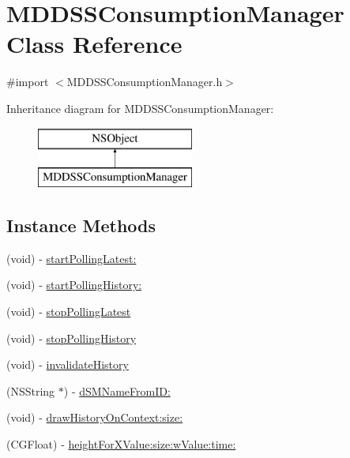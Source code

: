 \hypertarget{interface_m_d_d_s_s_consumption_manager}{\section{M\-D\-D\-S\-S\-Consumption\-Manager Class Reference}
\label{interface_m_d_d_s_s_consumption_manager}
}


{\ttfamily \#import $<$M\-D\-D\-S\-S\-Consumption\-Manager.\-h$>$}

Inheritance diagram for M\-D\-D\-S\-S\-Consumption\-Manager\-:\begin{figure}[H]
\begin{center}
\leavevmode
\includegraphics[height=2.000000cm]{interface_m_d_d_s_s_consumption_manager}
\end{center}
\end{figure}
\subsection*{Instance Methods}
\begin{DoxyCompactItemize}
\item 
(void) -\/ \hyperlink{interface_m_d_d_s_s_consumption_manager_aacfaedb3584a13fbeda5f2cf67223ce8}{start\-Polling\-Latest\-:}
\item 
(void) -\/ \hyperlink{interface_m_d_d_s_s_consumption_manager_a9a21d799de7fc9069558a53c73cdfb9c}{start\-Polling\-History\-:}
\item 
(void) -\/ \hyperlink{interface_m_d_d_s_s_consumption_manager_af253ad6e5f08008ceec0a247a27b2526}{stop\-Polling\-Latest}
\item 
(void) -\/ \hyperlink{interface_m_d_d_s_s_consumption_manager_a5c9bf787dd26bf05d1185cf06412ba32}{stop\-Polling\-History}
\item 
(void) -\/ \hyperlink{interface_m_d_d_s_s_consumption_manager_a4f8c8f4bff4220024dbb031d046b494c}{invalidate\-History}
\item 
(N\-S\-String $\ast$) -\/ \hyperlink{interface_m_d_d_s_s_consumption_manager_a4347a6f14215e842e5629072c1a883c4}{d\-S\-M\-Name\-From\-I\-D\-:}
\item 
(void) -\/ \hyperlink{interface_m_d_d_s_s_consumption_manager_ac4d5086c7cf8ce63e8e3996ba5e841ea}{draw\-History\-On\-Context\-:size\-:}
\item 
(C\-G\-Float) -\/ \hyperlink{interface_m_d_d_s_s_consumption_manager_a4df48a1a45fa35b89206c129fdcda839}{height\-For\-X\-Value\-:size\-:w\-Value\-:time\-:}
\end{DoxyCompactItemize}
